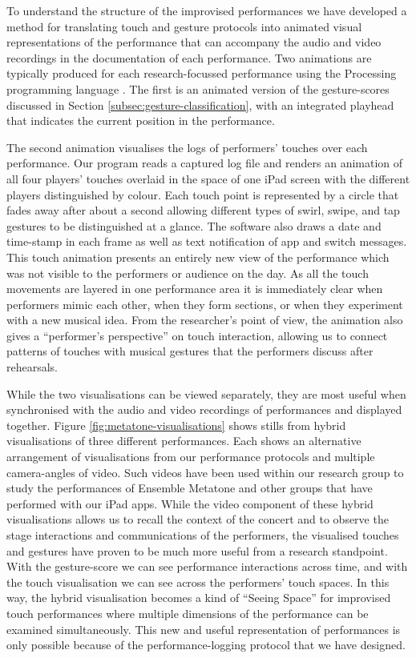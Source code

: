 \documentclass[graybox]{svmult}
\begin{document}
To understand the structure of the improvised performances we have
developed a method for translating touch and gesture protocols into
animated visual representations of the performance that can accompany
the audio and video recordings in the documentation of each
performance. Two animations are typically produced for each
research-focussed performance using the 
Processing programming language \citep{Reas:2006kq}.
The first is an animated version of the gesture-scores
discussed in Section \ref{subsec:gesture-classification}, with an
integrated playhead that indicates the current position in the
performance. 

The second animation visualises the logs of performers'
touches over each performance. Our program reads a captured log file
and renders an animation of all four players' touches overlaid in the
space of one iPad screen with the different players distinguished by
colour. Each touch point is represented by a circle that fades away
after about a second allowing different types of swirl, swipe, and tap
gestures to be distinguished at a glance. The software also draws a
date and time-stamp in each frame as well as text notification of app
and switch messages.
This touch animation presents an entirely new view of the
performance which was not visible to the performers or audience on the
day. As all the touch movements are layered in one performance area it
is immediately clear when performers mimic each other, when they form sections,
or when they experiment with a new musical idea. From the researcher's point of
view, the animation also gives a ``performer's perspective'' on touch
interaction, allowing us to connect patterns of touches with musical
gestures that the performers discuss after rehearsals.

While the two visualisations can be viewed separately, they are most
useful when synchronised with the audio and video recordings of
performances and displayed together. Figure
\ref{fig:metatone-visualisations} shows stills from hybrid
visualisations of three different performances. Each shows an
alternative arrangement of visualisations from our performance
protocols and multiple camera-angles of video. Such videos have been
used within our research group to study the performances of Ensemble
Metatone and other groups that have performed with our iPad apps.
While the video component of these hybrid visualisations allows us to
recall the context of the concert and to observe the stage
interactions and communications of the performers, the visualised
touches and gestures have proven to be much more useful from a
research standpoint. With the gesture-score we can see performance
interactions across time, and with the touch visualisation we can see
across the performers' touch spaces. In this way, the hybrid
visualisation becomes a kind of ``Seeing Space'' \citep{Victor:2014sf}
for improvised touch performances where multiple dimensions of the
performance can be examined simultaneously. This new and useful
representation of performances is only possible because of the
performance-logging protocol that we have designed.
\end{document}
